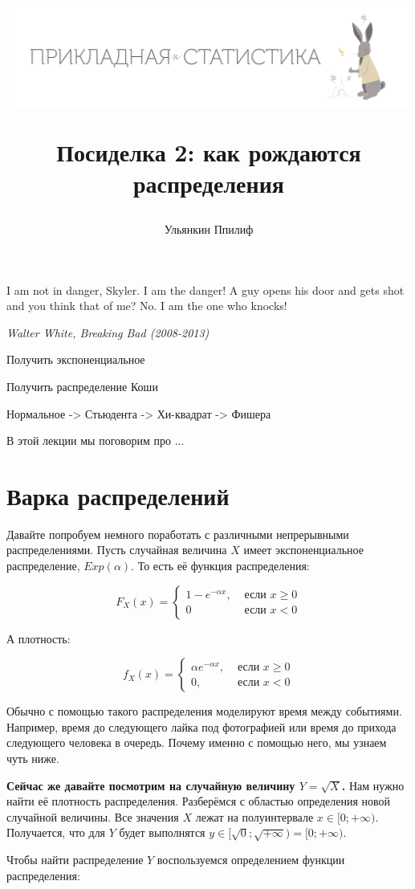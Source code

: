\documentclass[12pt, a4paper, oneside]{article}
\title{
\begin{center} 
\includegraphics[width=0.99\textwidth]{logo.png}
\end{center}

Посиделка 2: как рождаются распределения}
\date{ } %
\author{Ульянкин Ппилиф}
\begin{document}

\maketitle

\epigraph{I am not in danger, Skyler. I am the danger! A guy opens his door and gets shot and you think that of me? No. I am the one who knocks!}{\textit{Walter White, Breaking Bad (2008-2013)}}


Получить экспоненциальное 

Получить распределение Коши


Нормальное -> Стьюдента -> Хи-квадрат -> Фишера

В этой лекции мы поговорим про ... 


\section{Варка распределений}

Давайте попробуем немного поработать с различными непрерывными распределениями. Пусть случайная величина $X$ имеет экспоненциальное распределение, $Exp(\alpha)$. То есть её функция распределения: 

$$
F_X(x) = \begin{cases} 1 - e^{-\alpha x}, &\text{ если } x \ge 0 \\ 0 &\text{ если } x < 0  \end{cases}
$$

А плотность:

$$
f_X(x) = \begin{cases} \alpha e^{- \alpha x}, &\text{ если } x \ge 0 \\ 0, &\text{ если } x < 0  \end{cases}
$$

Обычно с помощью такого распределения моделируют время между событиями. Например, время до следующего лайка под фотографией или время до прихода следующего человека в очередь. Почему именно с помощью него, мы узнаем чуть ниже. 

\textbf{Сейчас же давайте посмотрим на случайную величину $Y = \sqrt{X}$.} Нам нужно найти её плотность распределения. Разберёмся с областью определения новой случайной величины. Все значения $X$ лежат на полуинтервале $x \in [0; +\infty)$.  Получается, что для $Y$ будет выполнятся $y \in [\sqrt{0}; \sqrt{+\infty}) = [0; +\infty)$. 

Чтобы найти распределение $Y$ воспользуемся определением функции распределения: 
\end{document}
